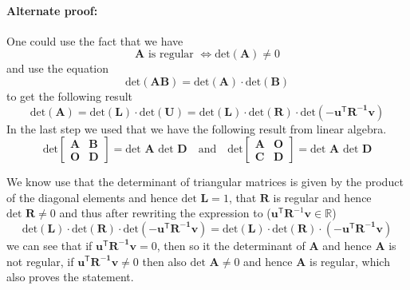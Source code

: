 \documentclass{article}
\begin{document}
\paragraph{Alternate proof:} One could use the fact that we have
\begin{equation*}
    \mathbf{A} \text{ is regular } \Longleftrightarrow \text{det}\left(\mathbf{A}\right) \neq 0
\end{equation*}
and use the equation
\begin{equation*}
    \text{det}\left(\mathbf{A}\mathbf{B}\right) = \text{det}\left(\mathbf{A}\right) \cdot \text{det}\left(\mathbf{B}\right)
\end{equation*}
to get the following result
\begin{equation*}
    \text{det}\left(\mathbf{A}\right) = 
    \text{det}\left(\mathbf{L}\right) \cdot 
    \text{det}\left(\mathbf{U}\right) = 
    \text{det}\left(\mathbf{L}\right) \cdot \text{det}\left(\mathbf{R}\right) \cdot \text{det}\left(-\mathbf{\mathbf{u}^{\mathsf{T}}\mathbf{R}^{-1}\mathbf{v}}\right) 
\end{equation*}
In the last step we used that we have the following result from linear algebra.
\begin{equation*}
    \text{det}
    \begin{bmatrix}
        \mathbf{A} & \mathbf{B} \\
        \mathbf{O} & \mathbf{D}
    \end{bmatrix} = \text{det }\mathbf{A}\text{ det }\mathbf{D}
    \quad \text{and} \quad 
    \text{det}
    \begin{bmatrix}
        \mathbf{A} & \mathbf{O} \\
        \mathbf{C} & \mathbf{D}
    \end{bmatrix} = \text{det }\mathbf{A}\text{ det }\mathbf{D}
\end{equation*}

\pagebreak

\noindent We know use that the determinant of triangular matrices is given by the product of the diagonal elements and hence $\text{det }\mathbf{L} = 1$, that $\mathbf{R}$ is regular and hence $\text{det }\mathbf{R} \neq 0$ and thus after rewriting the expression to ($\mathbf{u}^{\mathsf{T}}\mathbf{R}^{-1}\mathbf{v} \in \mathbb{R}$)
\begin{equation*}
    \text{det}\left(\mathbf{L}\right) \cdot \text{det}\left(\mathbf{R}\right) \cdot \text{det}\left(-\mathbf{\mathbf{u}^{\mathsf{T}}\mathbf{R}^{-1}\mathbf{v}}\right) = 
    \text{det}\left(\mathbf{L}\right) \cdot \text{det}\left(\mathbf{R}\right) \cdot \left(-\mathbf{\mathbf{u}^{\mathsf{T}}\mathbf{R}^{-1}\mathbf{v}}\right)
\end{equation*}
we can see that if $\mathbf{\mathbf{u}^{\mathsf{T}}\mathbf{R}^{-1}\mathbf{v}} = 0$, then so it the determinant of $\mathbf{A}$ and hence $\mathbf{A}$ is not regular, if $\mathbf{\mathbf{u}^{\mathsf{T}}\mathbf{R}^{-1}\mathbf{v}} \neq 0$ then also $\text{det }\mathbf{A} \neq 0$ and hence $\mathbf{A}$ is regular, which also proves the statement.
\end{document}
